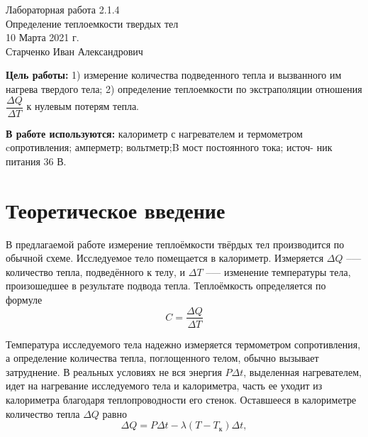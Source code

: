 




\setcounter{page}{1}

\begin{center}
  \LARGE{Лабораторная работа 2.1.4}\\[0.2cm]
  \LARGE{Определение теплоемкости твердых тел}\\[0.2cm]
  \large{10 Марта 2021 г.}\\[0.2cm]
  \large{Старченко Иван Александрович}\\[0.2cm]
\end{center}




\textbf{Цель работы:} 1) измерение количества подведенного тепла и вызванного им нагрева твердого тела; 2) определение теплоемкости по экстраполяции отношения $\dfrac {\Delta Q}{\Delta T}$ к нулевым потерям тепла.

\textbf{В работе используются:} калориметр с нагревателем и термометром cопротивления; амперметр; вольтметр;B мост постоянного тока; источ- ник питания 36 В.


\section{Теоретическое введение}

В предлагаемой работе измерение теплоёмкости твёрдых тел производится по обычной схеме. Исследуемое тело помещается в калориметр. Измеряется $\Delta Q$ --— количество тепла, подведённого к телу, и $\Delta T$ --— изменение температуры тела, произошедшее в результате подвода тепла. Теплоёмкость определяется по формуле
\begin{equation}	
	C = \dfrac{\Delta Q}{\Delta T}
\end{equation}

Температура исследуемого тела надежно измеряется термометром сопротивления, а определение количества тепла, поглощенного телом, обычно вызывает затруднение. В реальных условиях не вся энергия $P \Delta t$, выделенная нагревателем, идет на нагревание исследуемого тела и калориметра, часть ее уходит из калориметра благодаря теплопроводности его стенок. Оставшееся в калориметре количество тепла $\Delta Q$ равно
\begin{equation}
	\Delta Q = P\Delta t - \lambda \left( T - T_{\text{к}} \right) \Delta t,
\end{equation}

